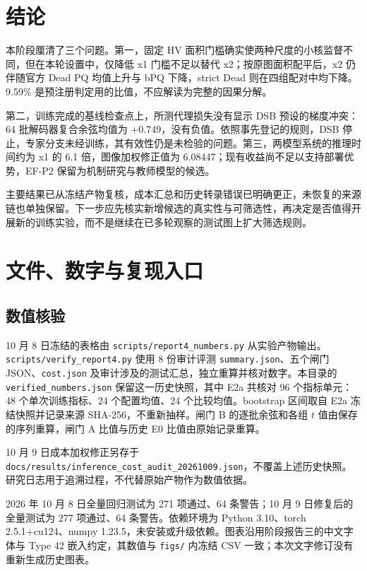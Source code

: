 \documentclass[11pt,a4paper,UTF8,fontset=fandol]{ctexart}
\newcommand{\code}[1]{\nolinkurl{#1}}
\begin{document}
\section{结论}

本阶段厘清了三个问题。第一，固定 HV 面积门槛确实使两种尺度的小核监督不同，但在本轮设置中，仅降低 x1 门槛不足以替代 x2；按原图面积配平后，x2 仍伴随官方 Dead PQ 均值上升与 bPQ 下降，strict Dead 则在四组配对中均下降。9.59\% 是预注册判定用的比值，不应解读为完整的因果分解。

第二，训练完成的基线检查点上，所测代理损失没有显示 DSB 预设的梯度冲突：64 批解码器复合余弦均值为 $+0.749$，没有负值。依照事先登记的规则，DSB 停止，专家分支未经训练，其有效性仍是未检验的问题。第三，两模型系统的推理时间约为 x1 的 6.1 倍，图像加权修正值为 6.08447；现有收益尚不足以支持部署优势，EF-P2 保留为机制研究与教师模型的候选。

主要结果已从冻结产物复核，成本汇总和历史转录错误已明确更正，未恢复的来源链也单独保留。下一步应先核实新增候选的真实性与可筛选性，再决定是否值得开展新的训练实验，而不是继续在已多轮观察的测试图上扩大筛选规则。

\appendix
\section{文件、数字与复现入口}

\subsection{数值核验}

10 月 8 日冻结的表格由 \code{scripts/report4\_numbers.py} 从实验产物输出。\code{scripts/verify\_report4.py} 使用 8 份审计评测 \code{summary.json}、五个闸门 JSON、\code{cost.json} 及审计涉及的测试汇总，独立重算并核对数字。本目录的 \code{verified\_numbers.json} 保留这一历史快照，其中 E2a 共核对 96 个指标单元：48 个单次训练指标、24 个配置均值、24 个比较均值。bootstrap 区间取自 E2a 冻结快照并记录来源 SHA-256，不重新抽样。闸门 B 的逐批余弦和各组 $t$ 值由保存的序列重算，闸门 A 比值与历史 E0 比值由原始记录重算。

10 月 9 日成本加权修正另存于 \code{docs/results/inference\_cost\_audit\_20261009.json}，不覆盖上述历史快照。研究日志\cite{findings}用于追溯过程，不代替原始产物作为数值依据。

2026 年 10 月 8 日全量回归测试为 271 项通过、64 条警告；10 月 9 日修复后的全量测试为 277 项通过、64 条警告。依赖环境为 Python 3.10、torch 2.5.1+cu124、numpy 1.23.5，未安装或升级依赖。图表沿用阶段报告三的中文字体与 Type 42 嵌入约定，其数值与 \code{figs/} 内冻结 CSV 一致；本次文字修订没有重新生成历史图表。
\end{document}
